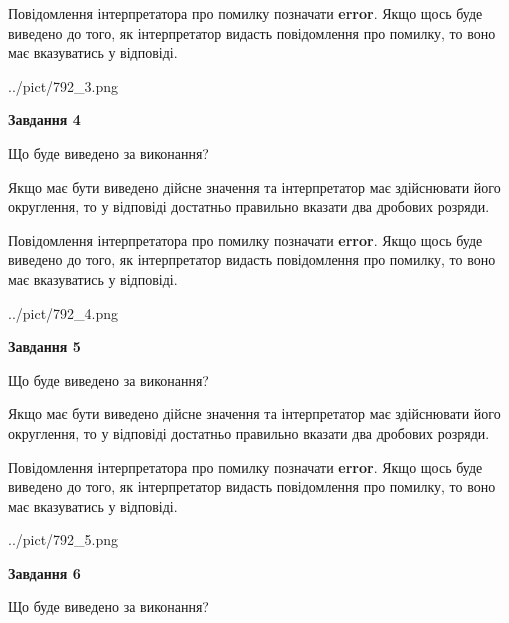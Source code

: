 \documentclass[12pt, ukrainian]{article}
\begin{document}
{\begin {Large}
Повідомлення інтерпретатора про помилку позначати \textbf{error}.
Якщо щось буде виведено до того, як інтерпретатор видасть повідомлення про помилку, 
то воно має вказуватись у відповіді. \par

\begin{center}
	{../pict/792_3.png}
\end{center}
\newpage

{\begin {center}\textbf{Завдання 4}\end {center}}\par
Що буде виведено за виконання? \par

Якщо має бути виведено дійсне значення та інтерпретатор має здійснювати його округлення, 
то у відповіді достатньо правильно вказати два дробових розряди.

Повідомлення інтерпретатора про помилку позначати \textbf{error}.
Якщо щось буде виведено до того, як інтерпретатор видасть повідомлення про помилку, 
то воно має вказуватись у відповіді. \par

\begin{center}
	{../pict/792_4.png}
\end{center}
\newpage

{\begin {center}\textbf{Завдання 5}\end {center}}\par
Що буде виведено за виконання? \par

Якщо має бути виведено дійсне значення та інтерпретатор має здійснювати його округлення, 
то у відповіді достатньо правильно вказати два дробових розряди.

Повідомлення інтерпретатора про помилку позначати \textbf{error}.
Якщо щось буде виведено до того, як інтерпретатор видасть повідомлення про помилку, 
то воно має вказуватись у відповіді. \par

\begin{center}
	{../pict/792_5.png}
\end{center}
\newpage

{\begin {center}\textbf{Завдання 6}\end {center}}\par
Що буде виведено за виконання? \par


\end{Large}}
\end{document}
